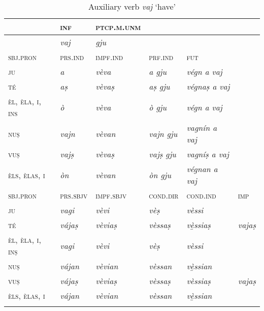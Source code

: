 \begin{table}
\caption{Auxiliary verb \textit{vaj} `have'}
\label{tab:aux:vaj}
 \begin{tabular}{llllll}
 
  \lsptoprule
& \textsc{inf}  & \textsc{ptcp.m.unm} \\
  \midrule
&  \textit{vaj} &\textit{gju} \\
     
  \lsptoprule
\textsc{sbj.pron}  &\textsc{prs.ind}  &\textsc{impf.ind} & \textsc{prf.ind} & \textsc{fut}\\
   \midrule
\textsc{ju} &\textit{a} & \textit{vèva} & \textit{a gju} & \textit{végn a vaj}\\
\textsc{té} &\textit{aṣ} & \textit{vèvaṣ} & \textit{aṣ gju} & \textit{végnaṣ a vaj}\\
\textsc{èl, èla, i, ins} &\textit{ò} & \textit{vèva} & \textit{ò gju} &\textit{végn a vaj}\\
\textsc{nuṣ} &\textit{vajn} & \textit{vèvan} & \textit{vajn gju} &\textit{vagnín a vaj}\\
\textsc{vuṣ} &\textit{vajṣ} & \textit{vèvaṣ} & \textit{vajṣ gju} &\textit{vagníṣ a vaj}\\
\textsc{èls, èlas, i}& \textit{òn} & \textit{vèvan} & \textit{òn gju} &\textit{végnan a vaj}\\

 \lsptoprule
\textsc{sbj.pron}  &\textsc{prs.sbjv} & \textsc{impf.sbjv}  &\textsc{cond.dir} & \textsc{cond.ind} & \textsc{imp} \\
\midrule
\textsc{ju} & \textit{vagi}& \textit{vèvi} & \textit{vèṣ} & \textit{vèssi}\\
\textsc{té} & \textit{vájaṣ}& \textit{vèviaṣ} & \textit{vèssaṣ} & \textit{vè̱ssiaṣ} &  \textit{vajaṣ}\\
\textsc{èl, èla, i, inṣ} & \textit{vagi} & \textit{vèvi} & \textit{vèṣ} & \textit{vèssi}\\
\textsc{nuṣ} & \textit{vájan}& \textit{vèvian} & \textit{vèssan} & \textit{vè̱ssian}\\
\textsc{vuṣ} & \textit{vájaṣ}& \textit{vèviaṣ} & \textit{vèssaṣ}& \textit{vèssiaṣ} &  \textit{vajaṣ}\\
\textsc{èls, èlas, i} & \textit{vájan}& \textit{vèvian} & \textit{vèssan} & \textit{vè̱ssian}\\
  \lspbottomrule
 \end{tabular}
\end{table}

